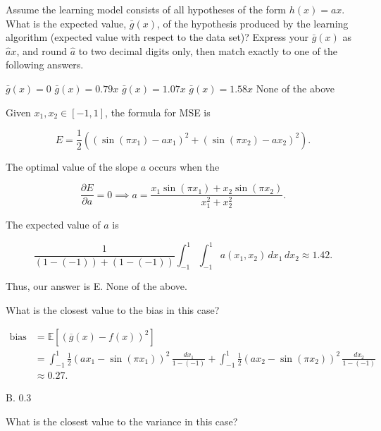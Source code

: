 \documentclass[answers]{exam}
\begin{document}
\begin{questions}
\setcounter{question}{3}
\question
Assume the learning model consists of all hypotheses of the form $h(x) = ax$. 
What is the expected value, $\bar{g}(x)$, of the hypothesis produced by the 
learning algorithm (expected value with respect to the data set)? Express your 
$\bar{g}(x)$ as $\hat{a}x$, and round $\hat{a}$ to two decimal digits only, then 
match exactly to one of the following answers.
\begin{choices}
    \choice $\bar{g}(x) = 0$
    \choice $\bar{g}(x) = 0.79x$
    \choice $\bar{g}(x) = 1.07x$
    \choice $\bar{g}(x) = 1.58x$
    \choice None of the above
\end{choices}

\begin{solution}
Given $x_1, x_2 \in [-1, 1]$, the formula for MSE is 

\[
E = \frac{1}{2}\left( (\sin(\pi x_1) - ax_1)^2 + (\sin(\pi x_2) - ax_2)^2 \right)
.\] 

The optimal value of the slope $a$ occurs when the 

\[
\frac{\partial E}{\partial a} = 0 \implies a = \frac{x_1\sin(\pi x_1) + x_2\sin(\pi x_2)}{x_1^2 + x_2^2}
.\] 

The expected value of $a$ is

\[
\frac{1}{(1 - (-1)) + (1 - (-1))} \int_{-1}^{1} \int_{-1}^{1} a(x_1,x_2) \, dx_1 \, dx_2 \approx 1.42
.\] 

Thus, our answer is E. None of the above.
\end{solution}

\question
What is the closest value to the bias in this case?
\begin{choices}
\end{choices}

\begin{solution}
\begin{align*}
    \text{bias} &= \mathbb{E}\left[ (\overline{g}(x) - f(x))^2 \right] \\ 
    &= \int_{-1}^{1} \frac{1}{2}(ax_1 - \sin(\pi x_1))^2 \, \frac{dx_1}{1 - (-1)} + 
    \int_{-1}^{1} \frac{1}{2}(ax_2 - \sin(\pi x_2))^2 \, \frac{dx_2}{1 - (-1)} \\
    &\approx 0.27
.\end{align*}

B. 0.3
\end{solution}

\question
What is the closest value to the variance in this case?
\begin{choices}
\end{choices}


\end{questions}
\end{document}
